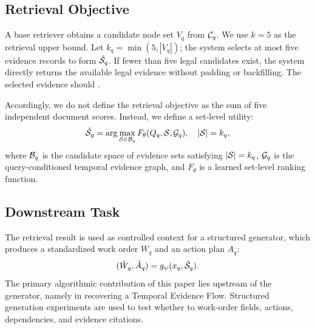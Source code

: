 \subsection{Retrieval Objective}

A base retriever obtains a candidate node set $V_q$ from $\mathcal{C}_q$. We use $k=5$ as the retrieval upper bound. Let $k_q=\min(5,|V_q|)$; the system selects at most five evidence records to form $\hat{\mathcal{S}}_q$. If fewer than five legal candidates exist, the system directly returns the available legal evidence without padding or backfilling. %
The selected evidence should .

Accordingly, we do not define the retrieval objective as the sum of five independent document scores. Instead, we define a set-level utility:
\begin{equation}
\hat{\mathcal{S}}_q
=
\arg\max_{\mathcal{S}\in\mathcal{B}_q}
F_{\theta}(Q_q,\mathcal{S},\mathcal{G}_q),
\quad |\mathcal{S}|=k_q,
\label{eq:set_selection}
\end{equation}
where $\mathcal{B}_q$ is the candidate space of evidence sets satisfying $|\mathcal{S}|=k_q$, $\mathcal{G}_q$ is the query-conditioned temporal evidence graph, and $F_{\theta}$ is a learned set-level ranking function.

\subsection{Downstream Task}

The retrieval result is used as controlled context for a structured generator, which produces a standardized work order $W_q$ and an action plan $A_q$:
\begin{equation}
(\hat W_q,\hat A_q)=g_{\psi}(x_q,\hat{\mathcal{S}}_q).
\label{eq:downstream_generation}
\end{equation}
The primary algorithmic contribution of this paper lies upstream of the generator, namely in recovering a  Temporal Evidence Flow. %
Structured generation experiments are used to test whether  to work-order fields, actions, dependencies, and evidence citations.

